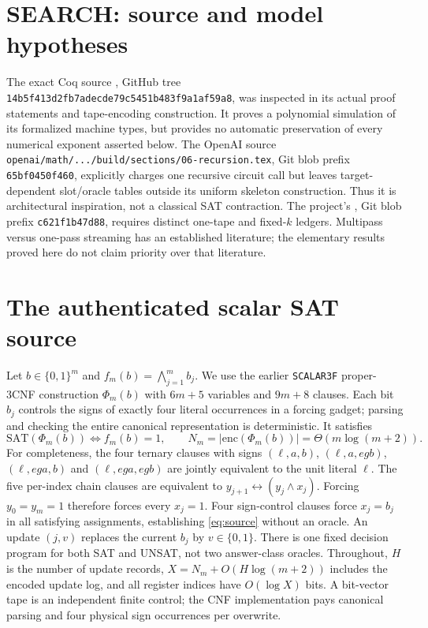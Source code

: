 \documentclass[11pt]{article}
\begin{document}
\section{SEARCH: source and model hypotheses}
The exact Coq source 
,
GitHub tree \texttt{14b5f413d2fb7adecde79c5451b483f9a1af59a8},
was inspected in its actual proof statements and tape-encoding construction.
It proves a polynomial simulation of its formalized machine types, but
provides no automatic preservation of every numerical exponent asserted
below.  The OpenAI source \texttt{openai/math/.../build/sections/06-recursion.tex},
Git blob prefix \texttt{65bf0450f460},
explicitly charges one recursive circuit call but leaves target-dependent
slot/oracle tables outside its uniform skeleton construction.  Thus it is
architectural inspiration, not a classical SAT contraction.
The project's ,
Git blob prefix \texttt{c621f1b47d88},
requires distinct one-tape and fixed-$k$ ledgers.  Multipass versus
one-pass streaming has an established literature; the elementary results
proved here do not claim priority over that literature.

\section{The authenticated scalar SAT source}
Let $b\in\{0,1\}^m$ and
$f_m(b)=\bigwedge_{j=1}^m b_j$.  We use the earlier \texttt{SCALAR3F}
proper-3CNF construction $\Phi_m(b)$ with $6m+5$ variables and $9m+8$
clauses.  Each bit $b_j$ controls the signs of exactly four literal
occurrences in a forcing gadget; parsing and checking the entire
canonical representation is deterministic.  It satisfies
\begin{equation}
\mathrm{SAT}(\Phi_m(b))\iff f_m(b)=1,
\qquad N_m=|\mathrm{enc}(\Phi_m(b))|=\Theta(m\log(m+2)).
\label{eq:source}
\end{equation}
For completeness, the four ternary clauses with signs
$(\ell,a,b)$, $(\ell,a,
eg b)$, $(\ell,
eg a,b)$ and
$(\ell,
eg a,
eg b)$ are jointly equivalent to the unit literal
$\ell$.  The five per-index chain clauses are equivalent to
$y_{j+1}\leftrightarrow(y_j\wedge x_j)$.  Forcing $y_0=y_m=1$
therefore forces every $x_j=1$.  Four sign-control clauses force
$x_j=b_j$ in all satisfying assignments, establishing
\eqref{eq:source} without an oracle.
An update $(j,v)$ replaces the current $b_j$ by $v\in\{0,1\}$.
There is one fixed decision program for both SAT and UNSAT, not two
answer-class oracles.  Throughout, $H$ is the number of update records,
$X=N_m+O(H\log(m+2))$ includes the encoded update log, and all register
indices have $O(\log X)$ bits.  A bit-vector tape is an independent
finite control; the CNF implementation pays canonical parsing and four
physical sign occurrences per overwrite.
\end{document}
